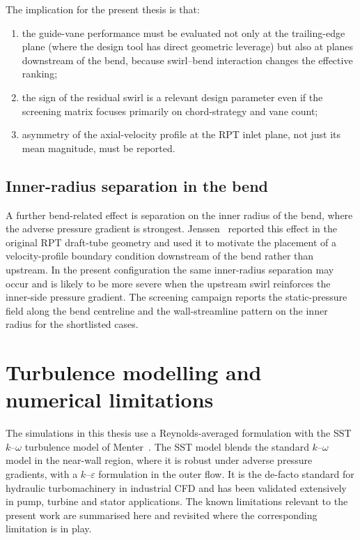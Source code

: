 The implication for the present thesis is that:
\begin{enumerate}
  \item the guide-vane performance must be evaluated not only at the trailing-edge plane (where the design tool has direct geometric leverage) but also at planes downstream of the bend, because swirl--bend interaction changes the effective ranking;
  \item the sign of the residual swirl is a relevant design parameter even if the screening matrix focuses primarily on chord-strategy and vane count;
  \item asymmetry of the axial-velocity profile at the RPT inlet plane, not just its mean magnitude, must be reported.
\end{enumerate}
 
\subsection{Inner-radius separation in the bend}
\label{sec:theory_bend_separation}
 
A further bend-related effect is separation on the inner radius of the bend, where the adverse pressure gradient is strongest. Jenssen~\cite{Jenssen2020} reported this effect in the original RPT draft-tube geometry and used it to motivate the placement of a velocity-profile boundary condition downstream of the bend rather than upstream. In the present configuration the same inner-radius separation may occur and is likely to be more severe when the upstream swirl reinforces the inner-side pressure gradient. The screening campaign reports the static-pressure field along the bend centreline and the wall-streamline pattern on the inner radius for the shortlisted cases.
 
\section{Turbulence modelling and numerical limitations}
\label{sec:theory_turbulence}
 
The simulations in this thesis use a Reynolds-averaged formulation with the SST $k$--$\omega$ turbulence model of Menter~\cite{Menter1994}. The SST model blends the standard $k$--$\omega$ model in the near-wall region, where it is robust under adverse pressure gradients, with a $k$--$\varepsilon$ formulation in the outer flow. It is the de-facto standard for hydraulic turbomachinery in industrial CFD and has been validated extensively in pump, turbine and stator applications. The known limitations relevant to the present work are summarised here and revisited where the corresponding limitation is in play.
 
